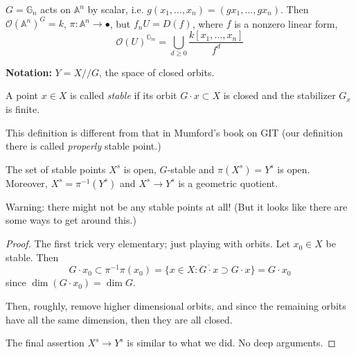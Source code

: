\begin{example}
\label{example-Hopf-surface?}
$G=\mathbb{G}_n$ acts on $\mathbb{A}^n$ by scalar, i.e. 
$g(x_1,\ldots,x_n)=(gx_1,\ldots,gx_n)$. Then $\mathcal{O}(\mathbb{A}^n)^G=k$,
$\pi:\mathbb{A}^n \to \bullet$,
but $f_nU=D(f)$, where $f$ is a nonzero linear form,
$$
\mathcal{O}(U)^{\mathbb{G}_m}=\bigcup_{d \geq 0}\frac{k[x_1,\ldots,x_n]}{f^d}
$$
\end{example}

{\bf Notation:} $Y=X//G$, the space of closed orbits.

\begin{definition}
\label{definition-stable-point}
A point $x \in X$ is called {\it stable} if its orbit $G\cdot x \subset X$ is
closed and the stabilizer  $G_x$ is finite.
\end{definition}

This definition is different from that in Mumford's book on GIT (our definition
there is called {\it properly} stable point.)

\begin{proposition}
\label{proposition-stable-points}
The set of stable points $X^s$ is open, $G$-stable and $\pi(X^s)=Y^s$ is open.
Moreover, $X^s=\pi^{-1}(Y^s)$ and $X^s \to Y^s$ is a geometric quotient.
\end{proposition}

Warning: there might not be any stable points at all! (But it looks like there
are some ways to get around this.)

\begin{proof}
The first trick very elementary; just playing with orbits. 
Let $x_0 \in X$ be stable. Then
$$
G\cdot x_0 \subset \pi^{-1}\pi(x_0)=\{ x \in X 
: \overline{G\cdot x}\supset G\cdot x\}=G\cdot x_0
$$
since $\dim (G\cdot x_0)=\dim G$.

Then, roughly, remove higher dimensional orbits, and since the remaining orbits
have all the same dimension, then they are all closed.

The final assertion $X^s \to Y^s$ is similar to what we did. No deep arguments.
\end{proof}

